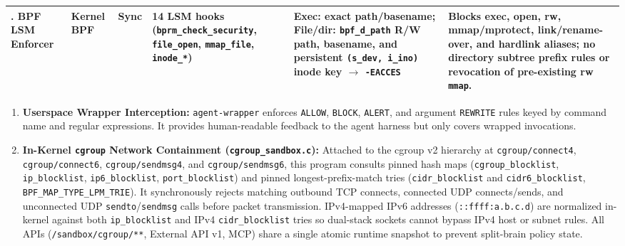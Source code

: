 \documentclass[10pt,twocolumn,letterpaper]{article}
\newcommand{\code}[1]{\texttt{\small #1}}
\begin{document}
\begin{table}[t]
\begin{tabularx}{\textwidth}{@{}llllXX@{}}
\addlinespace[2pt]
6. BPF LSM Enforcer & Kernel BPF & Sync & 14 LSM hooks (\code{bprm\_check\_security}, \code{file\_open}, \code{mmap\_file}, \code{inode\_*}) & Exec: exact path/basename; File/dir: \code{bpf\_d\_path} R/W path, basename, and persistent \code{(s\_dev, i\_ino)} inode key $\to$ \code{-EACCES} & Blocks exec, open, rw, mmap/mprotect, link/rename-over, and hardlink aliases; no directory subtree prefix rules or revocation of pre-existing rw \code{mmap}. \\
\bottomrule
\end{tabularx}
\end{table}

\begin{enumerate}
  \item \textbf{Userspace Wrapper Interception:} \code{agent-wrapper} enforces \code{ALLOW}, \code{BLOCK}, \code{ALERT}, and argument \code{REWRITE} rules keyed by command name and regular expressions. It provides human-readable feedback to the agent harness but only covers wrapped invocations.
  \item \textbf{In-Kernel \code{cgroup} Network Containment (\code{cgroup\_sandbox.c}):} Attached to the cgroup v2 hierarchy at \code{cgroup/connect4}, \code{cgroup/connect6}, \code{cgroup/sendmsg4}, and \code{cgroup/sendmsg6}, this program consults pinned hash maps (\code{cgroup\_blocklist}, \code{ip\_blocklist}, \code{ip6\_blocklist}, \code{port\_blocklist}) and pinned longest-prefix-match tries (\code{cidr\_blocklist} and \code{cidr6\_blocklist}, \code{BPF\_MAP\_TYPE\_LPM\_TRIE}). It synchronously rejects matching outbound TCP connects, connected UDP connects/sends, and unconnected UDP \code{sendto}/\code{sendmsg} calls before packet transmission. IPv4-mapped IPv6 addresses (\code{::ffff:a.b.c.d}) are normalized in-kernel against both \code{ip\_blocklist} and IPv4 \code{cidr\_blocklist} tries so dual-stack sockets cannot bypass IPv4 host or subnet rules. All APIs (\code{/sandbox/cgroup/**}, External API v1, MCP) share a single atomic runtime snapshot to prevent split-brain policy state.

\end{enumerate}
\end{document}
